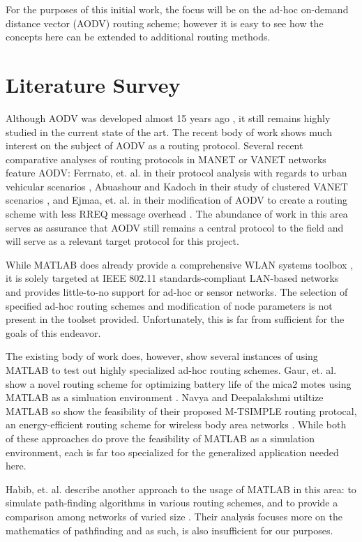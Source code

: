 \documentclass[conference]{IEEEtran}
\begin{document}
For the purposes of this initial work, the focus will be on the ad-hoc on-demand distance vector  (AODV) routing scheme; however it is easy to see how the concepts here can be extended to additional routing methods.

\section{Literature Survey}

Although AODV was developed almost 15 years ago \cite{rfc3561}, it still remains highly studied in the current state of the art. The recent body of work shows much interest on the subject of AODV as a routing protocol. Several recent comparative analyses of routing protocols in MANET or VANET networks feature AODV: Ferrnato, et. al. in their protocol analysis with regards to urban vehicular scenarios \cite{aodv_interest_urban}, Abuashour and Kadoch in their study of clustered VANET scenarios \cite{aodv_interest_vanet}, and Ejmaa, et. al. in their modification of AODV to create a routing scheme with less RREQ message overhead \cite{aodv_interest_overhead}. The abundance of work in this area serves as assurance that AODV still remains a central protocol to the field and will serve as a relevant target protocol for this project.

While MATLAB does already provide a comprehensive WLAN systems toolbox \cite{matlab_wlan_toolbox}, it is solely targeted at IEEE 802.11 standards-compliant LAN-based networks and provides little-to-no support for ad-hoc or sensor networks. The selection of specified ad-hoc routing schemes and modification of node parameters is not present in the toolset provided. Unfortunately, this is far from sufficient for the goals of this endeavor.

The existing body of work does, however, show several instances of using MATLAB to test out highly specialized ad-hoc routing schemes. Gaur, et. al. show a novel routing scheme for optimizing battery life of the mica2 motes using MATLAB as a simluation environment \cite{matlab_ex_mica2}. Navya and Deepalakshmi utiltize MATLAB so show the feasibility of their proposed M-TSIMPLE routing protocal, an energy-efficient routing scheme for wireless body area networks \cite{matlab_ex_mtsimple}.  While both of these approaches do prove the feasibility of MATLAB as a simulation environment, each is far too specialized for the generalized application needed here.

Habib, et. al. describe another approach to the usage of MATLAB in this area: to simulate path-finding algorithms in various routing schemes, and to provide a comparison among networks of varied size \cite{matlab_ex_pathfinding}. Their analysis focuses more on the mathematics of pathfinding and as such, is also insufficient for our purposes.
\end{document}
